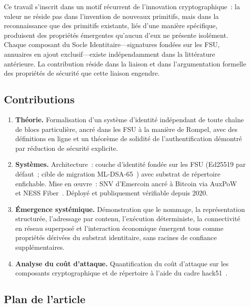 \documentclass[11pt,a4paper]{article}
\begin{document}
Ce travail s'inscrit dans un motif récurrent de l'innovation cryptographique~:
la valeur ne réside pas dans l'invention de nouveaux primitifs, mais dans la
reconnaissance que des primitifs existants, liés d'une manière spécifique,
produisent des propriétés émergentes qu'aucun d'eux ne présente isolément.
Chaque composant du Socle Identitaire---signatures fondées sur les FSU,
annuaires en ajout exclusif---existe indépendamment dans la littérature
antérieure.  La contribution réside dans la liaison et dans l'argumentation
formelle des propriétés de sécurité que cette liaison engendre.

\subsection{Contributions}

\begin{enumerate}[label=\textbf{C\arabic*.},leftmargin=*]
  \item \textbf{Théorie.}  Formalisation d'un système d'identité indépendant
    de toute chaîne de blocs particulière, ancré dans les FSU à la manière de
    Rompel, avec
    des définitions en ligne et un théorème de solidité de l'authentification
    démontré par réduction de sécurité explicite.

  \item \textbf{Systèmes.}  Architecture~: couche d'identité fondée sur les FSU
    (Ed25519 par défaut~; cible de migration ML-DSA-65~\cite{fips204}) avec
    substrat de répertoire enfichable.  Mise en \oe{}uvre~: SNV d'Emercoin
    ancré à Bitcoin via AuxPoW~\cite{emercoin} et NESS Fiber~\cite{onchain}.
    Déployé et publiquement vérifiable depuis 2020.

  \item \textbf{Émergence systémique.}  Démonstration que le nommage, la
    représentation structurée, l'adressage par contenu, l'exécution
    déterministe, la connectivité en réseau superposé et l'interaction
    économique émergent tous comme propriétés dérivées du substrat identitaire,
    sans racines de confiance supplémentaires.

  \item \textbf{Analyse du coût d'attaque.}  Quantification du coût d'attaque
    sur les composants cryptographique et de répertoire à l'aide du cadre
    hack51~\cite{hack51}.
\end{enumerate}

\subsection{Plan de l'article}
\end{document}
